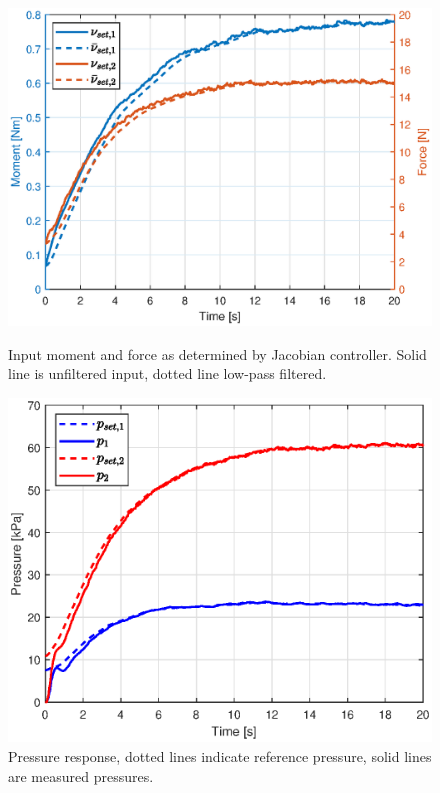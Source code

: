 \begin{figure}[H] 
    \begin{minipage}[b]{0.49\linewidth}
     \centering
    \includegraphics[width=\linewidth]{Figures/Chapter5/nuright.eps} 
    \caption{Input moment and force as determined by Jacobian controller. Solid line is unfiltered input, dotted line low-pass filtered. } 
    \label{fig5:nuright} 
       \end{minipage} 
    \begin{minipage}[b]{0.49\linewidth}
     \centering
    \includegraphics[width=\linewidth]{Figures/Chapter5/pressureright.eps} 
    \caption{Pressure response, dotted lines indicate reference pressure, solid lines are measured pressures.} 
    \label{fig5:pright} 
    \end{minipage} 
\end{figure}




